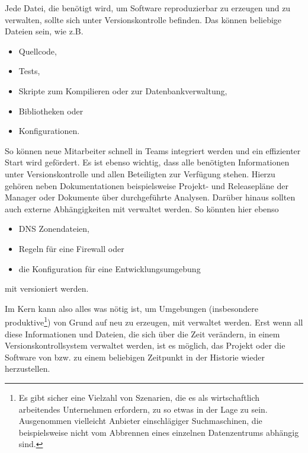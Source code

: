Jede Datei, die benötigt wird, um Software reproduzierbar zu erzeugen und zu
verwalten, sollte sich unter Versionskontrolle befinden. Das können beliebige
Dateien sein, wie z.B.

\begin{itemize}
\item Quellcode,
\item Tests,
\item Skripte zum Kompilieren oder zur Datenbankverwaltung,
\item Bibliotheken oder
\item Konfigurationen.
\end{itemize}

So können neue Mitarbeiter schnell in Teams integriert werden und ein
effizienter Start wird gefördert. Es ist ebenso wichtig, dass alle benötigten
Informationen unter Versionskontrolle und allen Beteiligten zur Verfügung
stehen. Hierzu gehören neben Dokumentationen beispielsweise Projekt- und
Releasepläne der Manager oder Dokumente über durchgeführte Analysen. Darüber
hinaus sollten auch externe Abhängigkeiten mit verwaltet werden. So könnten
hier ebenso

\begin{itemize}
\item DNS Zonendateien,
\item Regeln für eine Firewall oder
\item die Konfiguration für eine Entwicklungsumgebung
\end{itemize}

mit versioniert werden.

Im Kern kann also alles was nötig ist, um Umgebungen (insbesondere
produktive\footnote{Es gibt sicher eine Vielzahl von Szenarien, die es als
wirtschaftlich arbeitendes Unternehmen erfordern, zu so etwas in der Lage zu
sein. Ausgenommen vielleicht Anbieter einschlägiger Suchmaschinen, die
beispielsweise nicht vom Abbrennen eines einzelnen Datenzentrums abhängig
sind.}) von Grund auf neu zu erzeugen, mit verwaltet werden.  Erst wenn all
diese Informationen und Dateien, die sich über die Zeit verändern, in einem
Versionskontrollsystem verwaltet werden, ist es möglich, das Projekt oder die
Software von bzw. zu einem beliebigen Zeitpunkt in der Historie wieder
herzustellen. \cite[S.~33]{cd}

